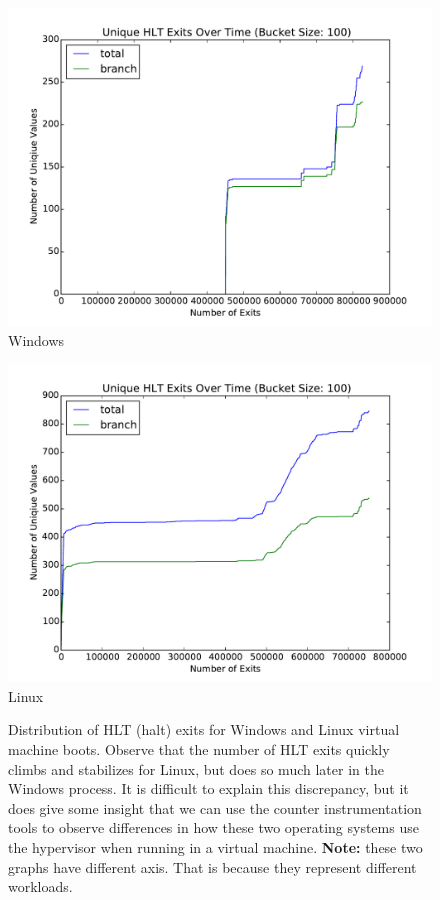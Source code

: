 \documentclass[notitlepage]{article}
\begin{document}
\begin{figure}[htpb!]
    \centering
    \begin{minipage}{.5\textwidth}
        \centering
        \includegraphics[width=1\textwidth]{hlt_windows.pdf}
        Windows
    \end{minipage}%
    \begin{minipage}{0.5\textwidth}
        \centering
        \includegraphics[width=1\textwidth]{hlt_linux.pdf}
        Linux
    \end{minipage}
    \caption{Distribution of HLT (halt) exits for Windows and Linux virtual
        machine boots. Observe that the number of HLT exits quickly climbs and
        stabilizes for Linux, but does so much later in the Windows process. It
        is difficult to explain this discrepancy, but it does give some insight
        that we can use the counter instrumentation tools to observe differences
        in how these two operating systems use the hypervisor when running in a
        virtual machine. \textbf{Note:} these two graphs have different axis.
    That is because they represent different workloads.} \label{fig:winlinhlt}
\end{figure}
\end{document}
